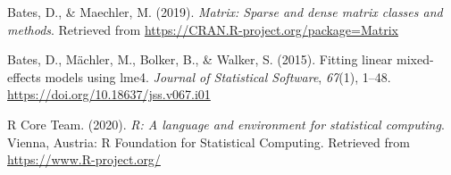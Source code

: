 \documentclass[
  english,
  man]{apa6}
\begin{document}
\leavevmode\hypertarget{ref-R-Matrix}{}%
Bates, D., \& Maechler, M. (2019). \emph{Matrix: Sparse and dense matrix classes and methods}. Retrieved from \url{https://CRAN.R-project.org/package=Matrix}

\leavevmode\hypertarget{ref-R-lme4}{}%
Bates, D., Mächler, M., Bolker, B., \& Walker, S. (2015). Fitting linear mixed-effects models using lme4. \emph{Journal of Statistical Software}, \emph{67}(1), 1--48. \url{https://doi.org/10.18637/jss.v067.i01}

\leavevmode\hypertarget{ref-R-base}{}%
R Core Team. (2020). \emph{R: A language and environment for statistical computing}. Vienna, Austria: R Foundation for Statistical Computing. Retrieved from \url{https://www.R-project.org/}

\endgroup
\end{document}

